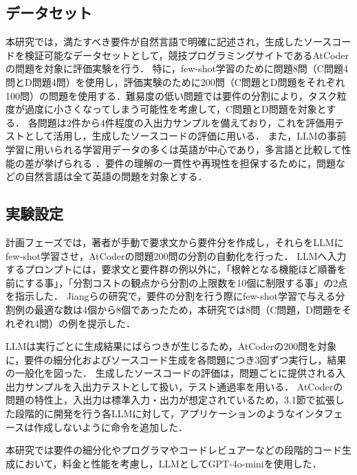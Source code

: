 \documentclass[submit,techrep,noauthor]{ipsj}
\begin{document}
\subsection{データセット}
本研究では，満たすべき要件が自然言語で明確に記述され，生成したソースコードを検証可能なデータセットとして，競技プログラミングサイトであるAtCoderの問題を対象に評価実験を行う．
特に，few-shot学習のために問題8問（C問題4問とD問題4問）を使用し，評価実験のために200問（C問題とD問題をそれぞれ100問）の問題を使用する．難易度の低い問題では要件の分割により，タスク粒度が過度に小さくなってしまう可能性を考慮して，C問題とD問題を対象とする．
各問題は2件から4件程度の入出力サンプルを備えており，これを評価用テストとして活用し，生成したソースコードの評価に用いる．
また，LLMの事前学習に用いられる学習用データの多くは英語が中心であり，多言語と比較して性能の差が挙げられる\cite{LLM_En} ．要件の理解の一貫性や再現性を担保するために，問題などの自然言語は全て英語の問題を対象とする．

\subsection{実験設定}
計画フェーズでは，著者が手動で要求文から要件分を作成し，それらをLLMにfew-shot学習させ，AtCoderの問題200問の分割の自動化を行った．
LLMへ入力するプロンプトには，要求文と要件群の例以外に，「根幹となる機能ほど順番を前にする事」，「分割コストの観点から分割の上限数を10個に制限する事」の2点を指示した．
Jiangらの研究\cite{tosem}で，要件の分割を行う際にfew-shot学習で与える分割例の最適な数は4個から8個であったため，本研究では8問（C問題，D問題をそれぞれ4問）の例を提示した．

LLMは実行ごとに生成結果にばらつきが生じるため，AtCoderの200問を対象に，要件の細分化およびソースコード生成を各問題につき3回ずつ実行し，結果の一般化を図った．
生成したソースコードの評価は，問題ごとに提供される入出力サンプルを入出力テストとして扱い，テスト通過率を用いる．
AtCoderの問題の特性上，入出力は標準入力・出力が想定されているため，3.1節で拡張した段階的に開発を行う各LLMに対して，アプリケーションのようなインタフェースは作成しないように命令を追加した．

本研究では要件の細分化やプログラマやコードレビュアーなどの段階的コード生成において，料金と性能を考慮し，LLMとしてGPT-4o-mini\cite{openai_gpt_4o_mini}を使用した．
\end{document}
